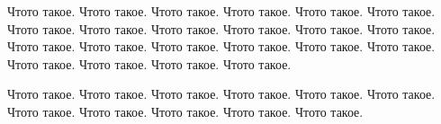 
Чтото такое. \cite{qwf}
Чтото такое. 
Чтото такое. Чтото такое. Чтото такое. Чтото такое. Чтото такое. 
Чтото такое. Чтото такое. Чтото такое. Чтото такое. Чтото такое. Чтото такое. Чтото такое.
 Чтото такое. Чтото такое. Чтото такое. Чтото такое. Чтото такое. Чтото такое. Чтото такое. Чтото такое. 

Чтото такое. Чтото такое. Чтото такое. Чтото такое. Чтото такое. Чтото такое. Чтото такое. Чтото такое. Чтото такое. Чтото такое. Чтото такое. 

\clearpage